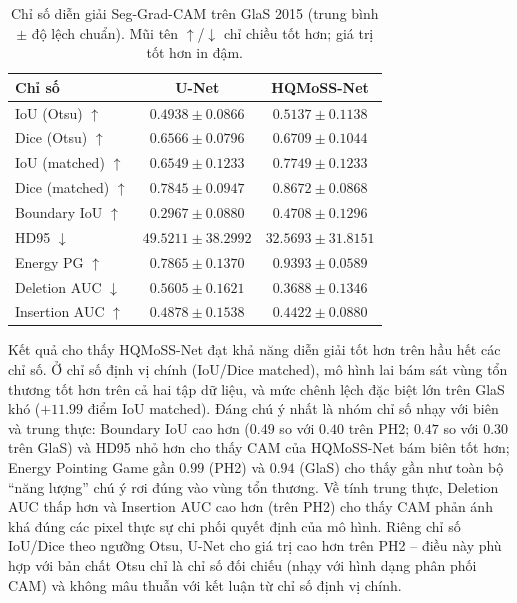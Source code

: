 \begin{table}[h]
\centering
\caption{Chỉ số diễn giải Seg-Grad-CAM trên GlaS 2015 (trung bình $\pm$ độ lệch chuẩn). Mũi tên $\uparrow$/$\downarrow$ chỉ chiều tốt hơn; giá trị tốt hơn in đậm.}
\label{tab:xai_glas}
\begin{tabular}{|l|c|c|}
\hline
\textbf{Chỉ số} & \textbf{U-Net} & \textbf{HQMoSS-Net} \\ \hline
IoU (Otsu) $\uparrow$      & $0.4938 \pm 0.0866$ & $\mathbf{0.5137 \pm 0.1138}$ \\ \hline
Dice (Otsu) $\uparrow$     & $0.6566 \pm 0.0796$ & $\mathbf{0.6709 \pm 0.1044}$ \\ \hline
IoU (matched) $\uparrow$   & $0.6549 \pm 0.1233$ & $\mathbf{0.7749 \pm 0.1233}$ \\ \hline
Dice (matched) $\uparrow$  & $0.7845 \pm 0.0947$ & $\mathbf{0.8672 \pm 0.0868}$ \\ \hline
Boundary IoU $\uparrow$    & $0.2967 \pm 0.0880$ & $\mathbf{0.4708 \pm 0.1296}$ \\ \hline
HD95 $\downarrow$          & $49.5211 \pm 38.2992$ & $\mathbf{32.5693 \pm 31.8151}$ \\ \hline
Energy PG $\uparrow$       & $0.7865 \pm 0.1370$ & $\mathbf{0.9393 \pm 0.0589}$ \\ \hline
Deletion AUC $\downarrow$  & $0.5605 \pm 0.1621$ & $\mathbf{0.3688 \pm 0.1346}$ \\ \hline
Insertion AUC $\uparrow$   & $\mathbf{0.4878 \pm 0.1538}$ & $0.4422 \pm 0.0880$ \\ \hline
\end{tabular}
\end{table}

\FloatBarrier

Kết quả cho thấy HQMoSS-Net đạt khả năng diễn giải tốt hơn trên hầu hết các chỉ số. Ở chỉ số định vị chính (IoU/Dice matched), mô hình lai bám sát vùng tổn thương tốt hơn trên cả hai tập dữ liệu, và mức chênh lệch đặc biệt lớn trên GlaS khó ($+11.99$ điểm IoU matched). Đáng chú ý nhất là nhóm chỉ số nhạy với biên và trung thực: Boundary IoU cao hơn ($0.49$ so với $0.40$ trên PH2; $0.47$ so với $0.30$ trên GlaS) và HD95 nhỏ hơn cho thấy CAM của HQMoSS-Net bám biên tốt hơn; Energy Pointing Game gần $0.99$ (PH2) và $0.94$ (GlaS) cho thấy gần như toàn bộ ``năng lượng'' chú ý rơi đúng vào vùng tổn thương. Về tính trung thực, Deletion AUC thấp hơn và Insertion AUC cao hơn (trên PH2) cho thấy CAM phản ánh khá đúng các pixel thực sự chi phối quyết định của mô hình. Riêng chỉ số IoU/Dice theo ngưỡng Otsu, U-Net cho giá trị cao hơn trên PH2 -- điều này phù hợp với bản chất Otsu chỉ là chỉ số đối chiếu (nhạy với hình dạng phân phối CAM) và không mâu thuẫn với kết luận từ chỉ số định vị chính.

